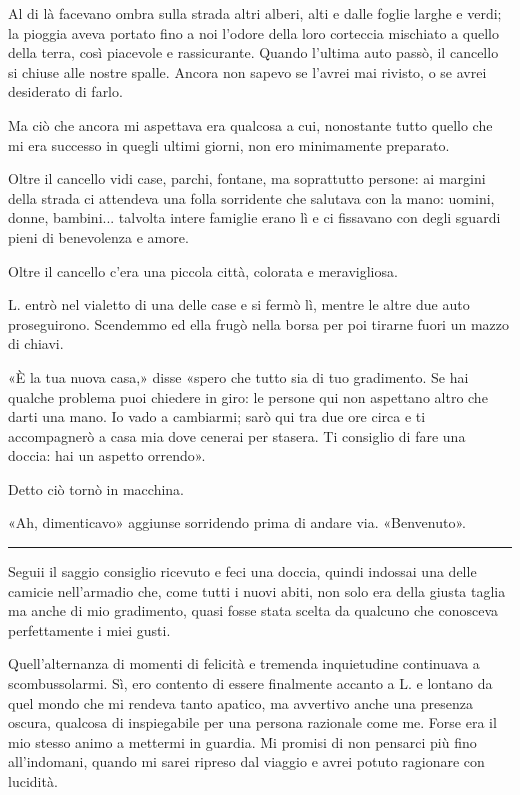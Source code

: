 \documentclass[a4paper,11pt,oneside,openright,final]{memoir}
\begin{document}
Al di là facevano ombra sulla strada altri alberi, alti e dalle foglie larghe e
verdi; la pioggia aveva portato fino a noi l'odore della loro corteccia
mischiato a quello della terra, così piacevole e rassicurante. Quando l'ultima
auto passò, il cancello si chiuse alle nostre spalle. Ancora non sapevo se
l'avrei mai rivisto, o se avrei desiderato di farlo.

Ma ciò che ancora mi aspettava era qualcosa a cui, nonostante tutto quello che
mi era successo in quegli ultimi giorni, non ero minimamente preparato.

Oltre il cancello vidi case, parchi, fontane, ma soprattutto persone: ai margini
della strada ci attendeva una folla sorridente che salutava con la mano: uomini,
donne, bambini... talvolta intere famiglie erano lì e ci fissavano con degli
sguardi pieni di benevolenza e amore.

Oltre il cancello c'era una piccola città, colorata e meravigliosa.

L. entrò nel vialetto di una delle case e si fermò lì, mentre le altre due
auto proseguirono. Scendemmo ed ella frugò nella borsa per poi tirarne fuori un
mazzo di chiavi.

«È la tua nuova casa,» disse «spero che tutto sia di tuo gradimento. Se hai
qualche problema puoi chiedere in giro: le persone qui non aspettano altro che
darti una mano. Io vado a cambiarmi; sarò qui tra due ore circa e ti
accompagnerò a casa mia dove cenerai per stasera. Ti consiglio di fare una
doccia: hai un aspetto orrendo».

Detto ciò tornò in macchina.

«Ah, dimenticavo» aggiunse sorridendo prima di andare via. «Benvenuto».

\plainbreak{1}

Seguii il saggio consiglio ricevuto e feci una doccia, quindi indossai una delle
camicie nell'armadio che, come tutti i nuovi abiti, non solo era della giusta
taglia ma anche di mio gradimento, quasi fosse stata scelta da qualcuno che
conosceva perfettamente i miei gusti.

Quell'alternanza di momenti di felicità e tremenda inquietudine continuava a
scombussolarmi. Sì, ero contento di essere finalmente accanto a L. e lontano da
quel mondo che mi rendeva tanto apatico, ma avvertivo anche una presenza oscura,
qualcosa di inspiegabile per una persona razionale come me. Forse era il mio
stesso animo a mettermi in guardia. Mi promisi di non pensarci più fino
all'indomani, quando mi sarei ripreso dal viaggio e avrei potuto ragionare con
lucidità.
\end{document}
